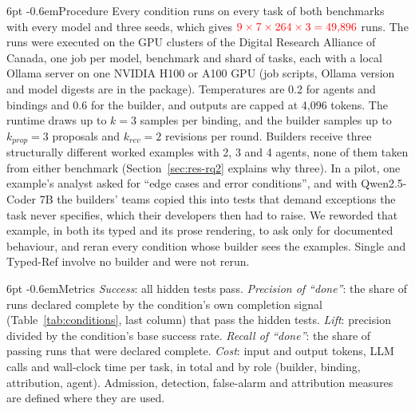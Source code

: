\documentclass[pdflatex,sn-mathphys-num]{sn-jnl}
\makeatletter
\theoremstyle{thmstyleone}%
\theoremstyle{thmstyletwo}%
\theoremstyle{thmstylethree}%
\newcommand{\tbd}[1]{\textcolor{red}{#1}}
\renewcommand\paragraph{\@startsection{paragraph}{4}{\z@}%
  {6pt \@plus 2pt \@minus 1pt}{-0.6em}{\normalfont\normalsize\bfseries}}
\makeatother
\begin{document}
\paragraph{Procedure} Every condition runs on every task of both benchmarks
with every model and three seeds, which gives
$\tbd{9\times7\times264\times3=49{,}896}$ runs. The runs were executed on
the GPU clusters of the Digital Research Alliance of Canada, one job per model,
benchmark and shard of tasks, each with a local Ollama server on one NVIDIA H100
or A100 GPU (job scripts, Ollama version and model digests are in the
package). Temperatures are 0.2 for agents and bindings and 0.6 for the
builder, and outputs are capped at 4{,}096 tokens. The runtime draws up to $k=3$
samples per binding, and the builder samples up to $k_{\mathit{prop}}=3$
proposals and $k_{\mathit{rev}}=2$ revisions per round. Builders receive three
structurally different worked examples with 2, 3 and 4 agents, none of them
taken from either benchmark (Section~\ref{sec:res-rq2} explains why three). In
a pilot, one example's analyst asked for ``edge cases and error
conditions'', and with Qwen2.5-Coder 7B the builders' teams copied this into
tests that demand exceptions the task never specifies, which their developers
then had to raise. We reworded that example, in both its typed and its prose
rendering, to ask only for documented behaviour, and reran every condition
whose builder sees the examples. Single and Typed-Ref involve no builder and
were not rerun.

\paragraph{Metrics} \emph{Success}: all hidden tests pass. \emph{Precision of
``done''}: the share of runs declared complete by the condition's own
completion signal (Table~\ref{tab:conditions}, last column) that pass the
hidden tests. \emph{Lift}: precision divided by the condition's base success
rate. \emph{Recall of ``done''}: the share of passing runs that were declared
complete. \emph{Cost}: input and output tokens, LLM calls and wall-clock time
per task, in total and by role (builder, binding, attribution, agent). Admission,
detection, false-alarm and attribution measures are defined where they are
used.
\end{document}
